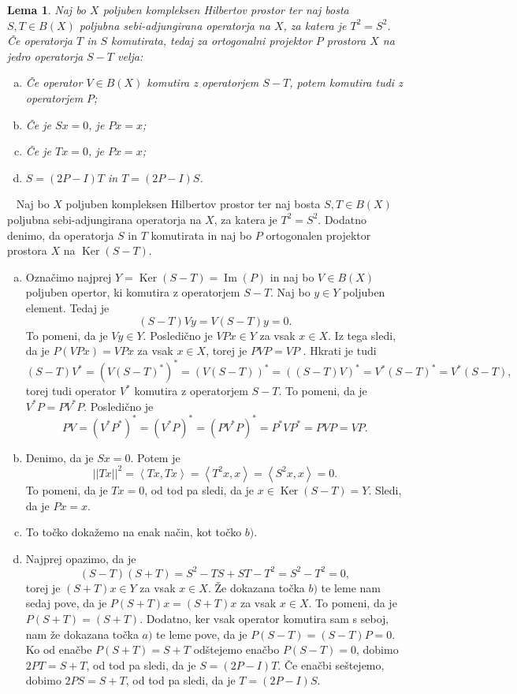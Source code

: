 \documentclass[12pt,a4paper,oneside,fleqn,openany]{book}
\newtheorem{lema}[izrek]{Lema}
\newcommand{\eopf}{\raisebox{0.8ex}{\framebox{}}} %
\newenvironment{dokaz}%
{\noindent{\bf Dokaz.}\ }%
{\hfill\eopf\par\bigskip}%
\newcommand{\abs}[1]{\ensuremath{\lvert #1 \rvert}}
\newcommand{\norm}[1]{\abs{\abs{#1}}}
\newcommand{\Sp}[2]{\ensuremath{\left<#1, #2\right>}}
\begin{document}
\begin{lema}
	\label{lem:sebiadjrazlpoz}
	Naj bo $X$ poljuben kompleksen Hilbertov prostor ter naj bosta $S, T\in B(X)$ poljubna sebi-adjungirana operatorja na $X$, za katera je $T^2 = S^2$. Če operatorja $T$ in $S$ komutirata, tedaj za ortogonalni projektor $P$ prostora $X$ na jedro operatorja $S-T$ velja: \begin{enumerate}[a)]
		\item Če operator $V\in B(X)$ komutira z operatorjem $S-T$, potem komutira tudi z operatorjem $P$;
		\item Če je $Sx=0$, je $Px=x$;
		\item Če je $Tx=0$, je $Px=x$;
		\item $S = (2P-I)T$ in $T=(2P-I)S$.
	\end{enumerate}
\end{lema}
\begin{dokaz}
	Naj bo $X$ poljuben kompleksen Hilbertov prostor ter naj bosta $S, T\in B(X)$ poljubna sebi-adjungirana operatorja na $X$, za katera je $T^2 = S^2$. Dodatno denimo, da operatorja $S$ in $T$ komutirata in naj bo $P$ ortogonalen projektor prostora $X$ na $\operatorname{Ker}(S-T)$.
	\begin{enumerate}[a)]
		\item Označimo najprej $Y = \operatorname{Ker}(S-T)=\operatorname{Im}(P)$ in naj bo $V\in B(X)$ poljuben opertor, ki komutira z operatorjem $S-T$. Naj bo $y\in Y$ poljuben element. Tedaj je $$(S-T)Vy=V(S-T)y=0.$$ To pomeni, da je $Vy\in Y$. Posledično je $VPx\in Y$ za vsak $x\in X$. Iz tega sledi, da je $P(VPx)= VPx$ za vsak $x\in X$, torej je $PVP = VP$ . Hkrati je tudi $$(S-T)V^*=(V(S-T)^*)^*=(V(S-T))^*=((S-T)V)^*=V^*(S-T)^*=V^*(S-T),$$ torej tudi operator $V^*$ komutira z operatorjem $S-T$. To pomeni, da je $V^*P = PV^*P$. Posledično je $$PV=(V^*P^*)^*=(V^*P)^*=(PV^*P)^*=P^*VP^*=PVP=VP.$$
		\item Denimo, da je $Sx =0$. Potem je $$\norm{Tx}^2=\Sp{Tx}{Tx}=\Sp{T^2x}{x}=\Sp{S^2x}{x}=0.$$ To pomeni, da je $Tx = 0$, od tod pa sledi, da je $x\in\operatorname{Ker}(S-T)=Y$. Sledi, da je $Px=x$.
		\item To točko dokažemo na enak način, kot točko $b)$.
		\item Najprej opazimo, da je $$(S-T)(S+T)=S^2-TS+ST-T^2=S^2-T^2=0,$$ torej je $(S+T)x\in Y$ za vsak $x\in X$. Že dokazana točka $b)$ te leme nam sedaj pove, da je $P(S+T)x = (S+T)x$ za vsak $x\in X$. To pomeni, da je $P(S+T)=(S+T)$. Dodatno, ker vsak operator komutira sam s seboj, nam že dokazana točka $a)$ te leme pove, da je $P(S-T)=(S-T)P=0$. Ko od enačbe $P(S+T)=S+T$ odštejemo enačbo $P(S-T)=0$, dobimo $2PT = S+T$, od tod pa sledi, da je $S=(2P -I)T$. Če enačbi seštejemo, dobimo $2PS = S + T$, od tod pa sledi, da je $T = (2P-I)S$.
	\end{enumerate}
\end{dokaz}
\end{document}
